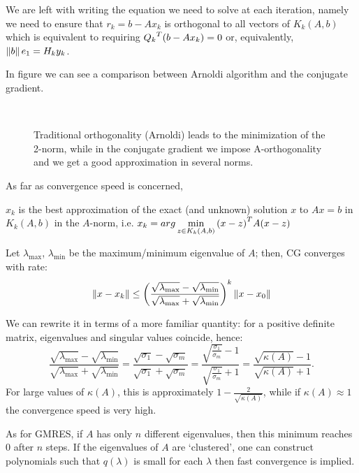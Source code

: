\documentclass[ComputationalMathematics.tex]{subfiles}
\begin{document}
We are left with writing the equation we need to solve at each iteration, namely we need to ensure that $r_k = b - A x_k$ is orthogonal to all vectors of $K_k(A, b)$ which is equivalent to requiring ${Q_k}^{T} (b - Ax_k) = 0$ or, equivalently, $\left\lVert b\right\rVert e_1 = H_k y_k$.

In figure  we can see a comparison between Arnoldi algorithm and the conjugate gradient.

\begin{figure}[h]
  \centering
  \hspace{0.5cm}
  \\
  \caption{Traditional orthogonality (Arnoldi) leads to the minimization of the 2-norm, while in the conjugate gradient we impose A-orthogonality and we get a good approximation in several norms.}\label{fig:13dic_parallel}
\end{figure}

As far as convergence speed is concerned, 

\begin{theorem}
  $x_k$ is the best approximation of the exact (and unknown) solution $x$ to $Ax=b$ in $K_k(A, b)$ in the $A$-norm, i.e. $x_k = arg \min\limits_{z \in K_k(A, b)} {(x-z)}^{T} A (x-z)$
\end{theorem}

\begin{theorem}
Let $\lambda_{\max}$, $\lambda_{\min}$ be the maximum/minimum eigenvalue of $A$; then, CG converges with rate:
\[
  \left\lVert x-x_k\right\rVert \leq {\left( \frac{\sqrt{\lambda_{\max}} - \sqrt{\lambda_{\min}}}{\sqrt{\lambda_{\max}} + \sqrt{\lambda_{\min}}}\right)}^k \left\lVert x-x_0\right\rVert
\]
\end{theorem}

We can rewrite it in terms of a more familiar quantity: for a positive definite matrix, eigenvalues and singular values coincide, hence:
\[
\frac{\sqrt{\lambda_{\max}} - \sqrt{\lambda_{\min}}}{\sqrt{\lambda_{\max}} + \sqrt{\lambda_{\min}}} = \frac{\sqrt{\sigma_1} - \sqrt{\sigma_m}}{\sqrt{\sigma_1} + \sqrt{\sigma_m}} = \frac{\sqrt{\frac{\sigma_1}{\sigma_m}}-1}{\sqrt{\frac{\sigma_1}{\sigma_m}}+1} = \frac{\sqrt{\kappa(A)}-1}{\sqrt{\kappa(A)}+1}.
\]
For large values of $\kappa(A)$, this is approximately $1 - \frac{2}{\sqrt{\kappa(A)}}$, while if $\kappa(A) \approx 1$ the convergence speed is very high.

As for GMRES, if $A$ has only $n$ different eigenvalues, then this minimum reaches $0$ after $n$ steps. If the eigenvalues of $A$ are `clustered', one can construct polynomials such that $q(\lambda)$ is small for each $\lambda$ then fast convergence is implied.
\end{document}
